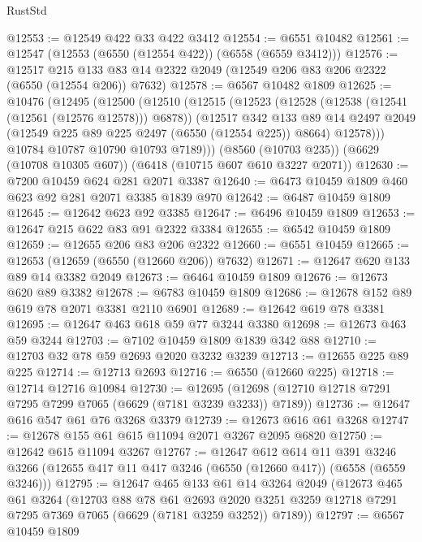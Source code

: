 \begin{lexlean}{RustStd}
\begin{coremodule}
@12553 := @12549 @422 @33 @422 @3412
@12554 := @6551 @10482
@12561 := @12547 (@12553 (@6550 (@12554 @422)) (@6558 (@6559 @3412)))
@12576 := @12517
    @215
    @133
    @83
    @14
    @2322
    @2049
    (@12549 @206 @83 @206 @2322 (@6550 (@12554 @206)) @7632)
@12578 := @6567 @10482 @1809
@12625 := @10476
    (@12495
      (@12500
        (@12510
          (@12515
            (@12523
              (@12528 (@12538 (@12541 (@12561 (@12576 @12578))) @6878))
              (@12517
                @342
                @133
                @89
                @14
                @2497
                @2049
                (@12549 @225 @89 @225 @2497 (@6550 (@12554 @225)) @8664)
                @12578)))
          @10784
          @10787
          @10790
          @10793
          @7189)))
    (@8560 (@10703 @235))
    (@6629 (@10708 @10305 @607))
    (@6418 (@10715 @607 @610 @3227 @2071))
@12630 := @7200 @10459 @624 @281 @2071 @3387
@12640 := @6473 @10459 @1809 @460 @623 @92 @281 @2071 @3385 @1839 @970
@12642 := @6487 @10459 @1809
@12645 := @12642 @623 @92 @3385
@12647 := @6496 @10459 @1809
@12653 := @12647 @215 @622 @83 @91 @2322 @3384
@12655 := @6542 @10459 @1809
@12659 := @12655 @206 @83 @206 @2322
@12660 := @6551 @10459
@12665 := @12653 (@12659 (@6550 (@12660 @206)) @7632)
@12671 := @12647 @620 @133 @89 @14 @3382 @2049
@12673 := @6464 @10459 @1809
@12676 := @12673 @620 @89 @3382
@12678 := @6783 @10459 @1809
@12686 := @12678 @152 @89 @619 @78 @2071 @3381 @2110 @6901
@12689 := @12642 @619 @78 @3381
@12695 := @12647 @463 @618 @59 @77 @3244 @3380
@12698 := @12673 @463 @59 @3244
@12703 := @7102 @10459 @1809 @1839 @342 @88
@12710 := @12703 @32 @78 @59 @2693 @2020 @3232 @3239
@12713 := @12655 @225 @89 @225
@12714 := @12713 @2693
@12716 := @6550 (@12660 @225)
@12718 := @12714 @12716 @10984
@12730 := @12695 (@12698 (@12710 @12718 @7291 @7295 @7299 @7065 (@6629 (@7181 @3239 @3233)) @7189))
@12736 := @12647 @616 @547 @61 @76 @3268 @3379
@12739 := @12673 @616 @61 @3268
@12747 := @12678 @155 @61 @615 @11094 @2071 @3267 @2095 @6820
@12750 := @12642 @615 @11094 @3267
@12767 := @12647
    @612
    @614
    @11
    @391
    @3246
    @3266
    (@12655 @417 @11 @417 @3246 (@6550 (@12660 @417)) (@6558 (@6559 @3246)))
@12795 := @12647
    @465
    @133
    @61
    @14
    @3264
    @2049
    (@12673
      @465
      @61
      @3264
      (@12703
        @88
        @78
        @61
        @2693
        @2020
        @3251
        @3259
        @12718
        @7291
        @7295
        @7369
        @7065
        (@6629 (@7181 @3259 @3252))
        @7189))
@12797 := @6567 @10459 @1809

\end{coremodule}
\end{lexlean}
